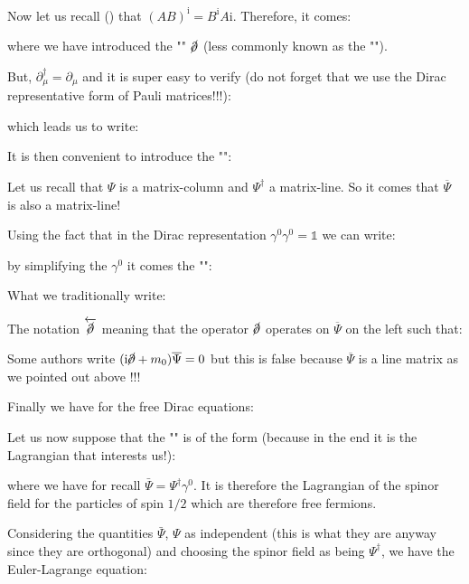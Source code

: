 	Now let us recall () that $(AB)^\mathrm{i}=B^\mathrm{i}A\mathrm{i}$. Therefore, it comes:
	
	where we have introduced the "" $\cancel{\partial}$ (less commonly known as the "").
	
	But, $\partial_\mu^\dagger=\partial_\mu$ and it is super easy to verify (do not forget that we use the Dirac representative form of Pauli matrices!!!):
	
	which leads us to write:
	
	It is then convenient to introduce the "":
	
	\begin{tcolorbox}[title=Remark,colframe=black,arc=10pt]
	Let us recall that $\Psi$ is a matrix-column and $\Psi^\dagger$ a matrix-line. So it comes that $\overline{\Psi}$ is also a matrix-line!
	\end{tcolorbox}
	Using the fact that in the Dirac representation $\gamma^0 \gamma^0 =\mathds{1}$ we can write:
	
	by simplifying the $\gamma^0$ it comes the "":
	
	What we traditionally write:
	
	The notation $\overleftarrow{\cancel{\partial}}$ meaning that the operator $\cancel{\partial}$ operates on $\overline{\Psi}$ on the left such that:
	
	\begin{tcolorbox}[title=Remark,colframe=black,arc=10pt]
	Some authors write $(\mathrm{i}\cancel{\partial}+m_0)\overline{\Psi}=0$ but this is false because $\overline{\Psi}$ is a line matrix as we pointed out above !!!
	\end{tcolorbox}
	Finally we have for the free Dirac equations:
	
	Let us now suppose that the "" is of the form (because in the end it is the Lagrangian that interests us!):
	
	where we have for recall $\bar{\Psi}=\Psi^\dagger \gamma^0$. It is therefore the Lagrangian of the spinor field for the particles of spin $1/2$ which are therefore free fermions.

	Considering the quantities $\bar{\Psi}$, $\Psi$ as independent (this is what they are anyway since they are orthogonal) and choosing the spinor field as being $\Psi^\dagger$, we have the Euler-Lagrange equation:
	
